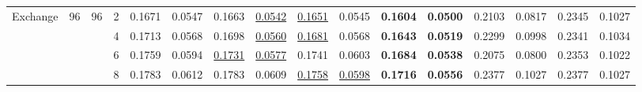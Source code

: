 {\begin{table}[tb]
{\begin{tabular}{p{10mm}p{6mm}p{6mm}p{6mm}p{8mm}p{8mm}p{8mm}p{8mm}p{8mm}p{8mm}p{8mm}p{8mm}p{8mm}p{8mm}p{8mm}p{8mm}}
                          \midrule
\multirow{4}{*}{Exchange} & \multirow{4}{*}{96}     & \multirow{4}{*}{96}      & 2                       & 0.1671& 	0.0547   &0.1663 & \underline{0.0542}    & \underline{0.1651}        & 0.0545       & \textbf{0.1604}       &\textbf{0.0500}       & 0.2103        & 0.0817        & 0.2345         & 0.1027        \\
                          &                         &                          & 4                       & 0.1713 	&0.0568 &0.1698 &\underline{0.0560} 
      & \underline{0.1681}        & 0.0568       & \textbf{0.1643}       & \textbf{0.0519}       & 0.2299        & 0.0998        & 0.2341         & 0.1034        \\
                          &                         &                          & 6                       & 0.1759	&0.0594   & \underline{0.1731}&  \underline{0.0577}   & 0.1741        & 0.0603       & \textbf{0.1684}       & \textbf{0.0538}       & 0.2075        & 0.0800        & 0.2353         & 0.1022        \\
                          &                         &                          & 8                       & 0.1783	&0.0612  & 0.1783&  0.0609 & \underline{0.1758}        & \underline{0.0598}       & \textbf{0.1716}       & \textbf{0.0556}       & 0.2377        & 0.1027        & 0.2377         & 0.1027        \\
                          \midrule



\end{tabular}}
\end{table}}
